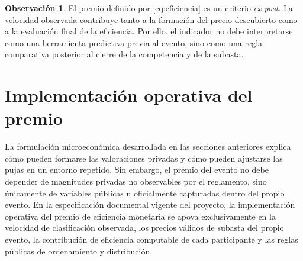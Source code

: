 \documentclass[11pt,a4paper]{article}
\theoremstyle{definition}
\newtheorem{observacion}{Observación}
\begin{document}
\begin{observacion}
El premio definido por \eqref{eq:eficiencia} es un criterio \emph{ex post}. La velocidad observada contribuye tanto a la formación del precio descubierto como a la evaluación final de la eficiencia. Por ello, el indicador no debe interpretarse como una herramienta predictiva previa al evento, sino como una regla comparativa posterior al cierre de la competencia y de la subasta.
\end{observacion}

\section{Implementación operativa del premio}

La formulación microeconómica desarrollada en las secciones anteriores explica cómo pueden formarse las valoraciones privadas y cómo pueden ajustarse las pujas en un entorno repetido. Sin embargo, el premio del evento no debe depender de magnitudes privadas no observables por el reglamento, sino únicamente de variables públicas u oficialmente capturadas dentro del propio evento. En la especificación documental vigente del proyecto, la implementación operativa del premio de eficiencia monetaria se apoya exclusivamente en la velocidad de clasificación observada, los precios válidos de subasta del propio evento, la contribución de eficiencia computable de cada participante y las reglas públicas de ordenamiento y distribución.
\end{document}
